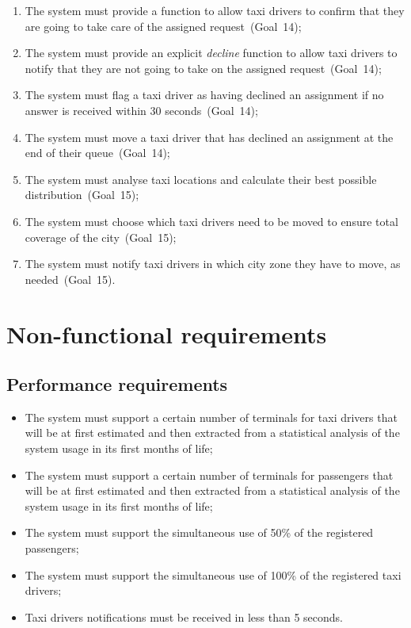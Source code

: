 \begin{enumerate}
\item The system must provide a function to allow taxi drivers to confirm that they are going to take care of the assigned request~(Goal~14);
\item The system must provide an explicit \emph{decline} function to allow taxi drivers to notify that they are not going to take on the assigned request~(Goal~14);
\item The system must flag a taxi driver as having declined an assignment if no answer is received within 30 seconds~(Goal~14);
\item The system must move a taxi driver that has declined an assignment at the end of their queue~(Goal~14);

\item The system must analyse taxi locations and calculate their best possible distribution~(Goal~15);
\item The system must choose which taxi drivers need to be moved to ensure total coverage of the city~(Goal~15);
\item The system must notify taxi drivers in which city zone they have to move, as needed~(Goal~15).
\end{enumerate}


\section{Non-functional requirements}

\subsection{Performance requirements}
\begin{itemize}

\item The system must support a certain number of terminals for taxi drivers that will be at first estimated and then extracted from a statistical analysis of the system usage in its first months of life;
\item The system must support a certain number of terminals for passengers that will be at first estimated and then extracted from a statistical analysis of the system usage in its first months of life;
\item The system must support the simultaneous use of 50\% of the registered passengers;
\item The system must support the simultaneous use of 100\% of the registered taxi drivers;
\item Taxi drivers notifications must be received in less than 5 seconds.

\end{itemize}

